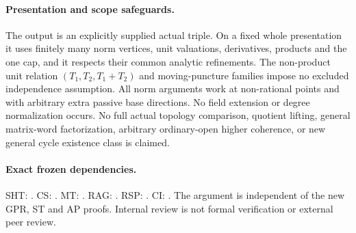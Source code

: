 \paragraph{Presentation and scope safeguards.}
The output is an explicitly supplied actual triple.  On a fixed
whole presentation it uses finitely many norm vertices, unit
valuations, derivatives, products and the one cap, and it respects
their common analytic refinements.  The non-product unit relation
$(T_1,T_2,T_1+T_2)$ and moving-puncture families impose no excluded
independence assumption.  All norm arguments work at non-rational
points and with arbitrary extra passive base directions.  No field
extension or degree normalization occurs.  No full actual topology
comparison, quotient lifting, general matrix-word factorization,
arbitrary ordinary-open higher coherence, or new general cycle
existence class is claimed.

\paragraph{Exact frozen dependencies.}
SHT: .
CS: .
MT: .
RAG: .
RSP: .
CI: .
The argument is independent of the new GPR, ST and AP proofs.
Internal review is not formal verification or external peer review.

